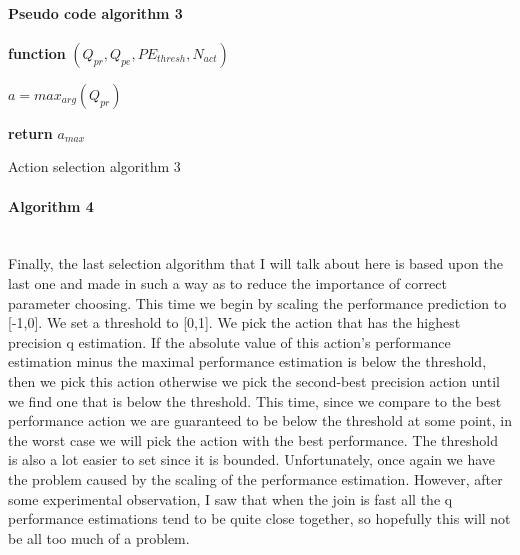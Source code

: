 \paragraph{Pseudo code algorithm 3}
\begin{center}
	\begin{algorithm}[H]

    \textbf{function}  $(Q_{pr},Q_{pe},PE_{thresh},N_{act})$\;
    
    
    \Indp{}\Indm
    \Indp{} \Indm
    \Indp
   	$a=max_{arg}(Q_{pr})$\\
    
   
  
   \textbf{return} $a_{max}$
   
    
\caption{Action selection algorithm 3}
\end{algorithm}
\end{center}
\paragraph{Algorithm 4}\mbox{}\\
Finally, the last selection algorithm that I will talk about here is based upon the last one and made in such a way as to reduce the importance of correct parameter choosing. This time we begin by scaling the performance prediction to [-1,0]. We set a threshold to [0,1]. We pick the action that has the highest precision q estimation. If the absolute value of this action's performance estimation minus the maximal performance estimation is below the threshold, then we pick this action otherwise we pick the second-best precision action until we find one that is below the threshold. This time, since we compare to the best performance action we are guaranteed to be below the threshold at some point, in the worst case we will pick the action with the best performance. The threshold is also a lot easier to set since it is bounded. Unfortunately, once again we have the problem caused by the scaling of the performance estimation. However, after some experimental observation, I saw that when the join is fast all the q performance estimations tend to be quite close together, so hopefully this will not be all too much of a problem.
